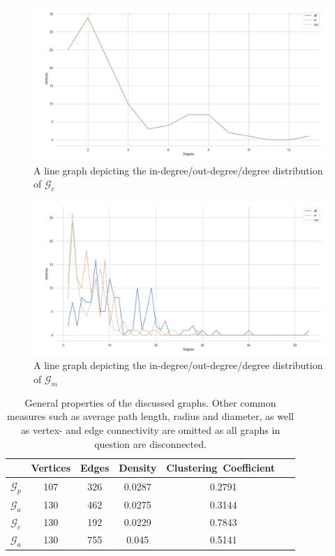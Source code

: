 \documentclass[11pt,a4paper]{book}
\theoremstyle{definition}
\theoremstyle{definition}
\theoremstyle{definition}
\theoremstyle{remark}
\newcommand{\pgraph}{\mathcal{G}_{p}}
\newcommand{\agraph}{\mathcal{G}_{a}}
\newcommand{\cgraph}{\mathcal{G}_{c}}
\newcommand{\acgraph}{\mathcal{G}_{m}}
\begin{document}
\begin{figure}[h]
\includegraphics[width=\textwidth]{cgraph_degree_distribution.png}
\caption{A line graph depicting the in-degree/out-degree/degree distribution of $\cgraph$}
\label{fig:cgraph-degree_distr}
\end{figure}


\begin{figure}[h]
\includegraphics[width=\textwidth]{acgraph_degree_distribution.png}
\caption{A line graph depicting the in-degree/out-degree/degree distribution of $\acgraph$}
\label{fig:cgraph-degree_distr}
\end{figure}



\begin{center}
\begin{table}
\small
\centering
\begin{tabular}{c| c c c c c}
\toprule
{} &  Vertices & Edges  &  Density & Clustering\ Coefficient\ \\
\midrule
$\pgraph$ & 107  & 326 &  0.0287 &  0.2791 \\
$\agraph$  & 130  & 462 &   0.0275 &  0.3144 \\
$\cgraph$  & 130  & 192 &  0.0229 &  0.7843 \\
$\agraph$  & 130  & 755 & 0.045 &  0.5141 \\
\bottomrule
\end{tabular}
\caption{General properties of the discussed graphs. Other common measures such as average path length, radius and diameter, as well as vertex- and edge connectivity are omitted as all graphs in question are disconnected.} 
\label{tab:graph-stat}
\end{table}
\end{center}
\end{document}
